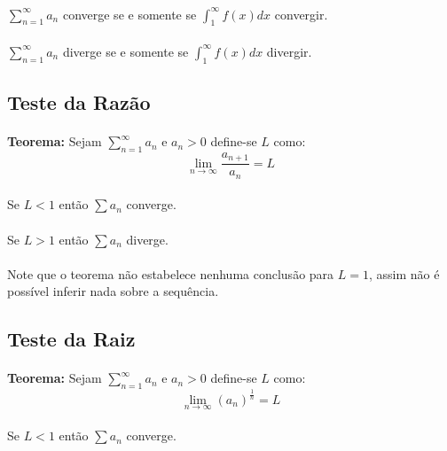 \documentclass{article}
\begin{document}
\begin{enumerate}[rightmargin = \leftmargin]
        \paragraph{}$\sum\limits_{n=1}^{\infty}a_{n}$ converge se e somente se $\int_{1}^{\infty}f(x)dx$ convergir.
        \paragraph{}$\sum\limits_{n=1}^{\infty}a_{n}$ diverge se e somente se $\int_{1}^{\infty}f(x)dx$ divergir.
        
    \subsection{Teste da Razão}
        \paragraph{}\textbf{Teorema:} Sejam $\sum\limits_{n=1}^{\infty}a_{n}$ e $a_{n}>0$ define-se $L$ como:
            \[\lim_{n\to\infty}\frac{a_{n+1}}{a_{n}}=L\]
        \paragraph{}Se $L<1$ então $\sum a_{n}$ converge.
        \paragraph{}Se $L>1$ então $\sum a_{n}$ diverge.
        \paragraph{}Note que o teorema não estabelece nenhuma conclusão para $L=1$, assim não é possível inferir nada sobre a sequência. 
        
    \subsection{Teste da Raiz}
        \paragraph{}\textbf{Teorema:} Sejam $\sum\limits_{n=1}^{\infty}a_{n}$ e $a_{n}>0$ define-se $L$ como:
            \[\lim_{n\to\infty}{(a_{n})}^{\frac{1}{n}}=L\]
        \paragraph{}Se $L<1$ então $\sum a_{n}$ converge.

\end{enumerate}
\end{document}
